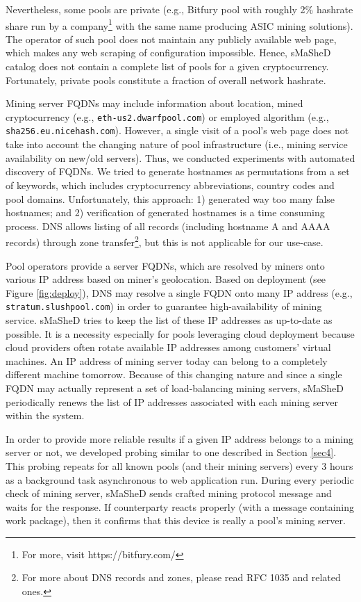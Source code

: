 \documentclass[preprint,12pt,3p]{elsarticle}
\begin{document}
Nevertheless, some pools are private (e.g., Bitfury pool with roughly 2\% hashrate share \cite{BTCCOM-BITFURY} run by a company\footnote{For more, visit https://bitfury.com/} with the same name producing ASIC mining solutions). The operator of such pool does not maintain any publicly available web page, which makes any web scraping of configuration impossible. Hence, sMaSheD catalog does not contain a complete list of pools for a given cryptocurrency. Fortunately, private pools constitute a fraction of overall network hashrate.

Mining server FQDNs may include information about location, mined cryptocurrency (e.g., \texttt{eth-us2.dwarfpool.com}) or employed algorithm (e.g., \texttt{sha256.eu.nicehash.com}). However, a single visit of a pool's web page does not take into account the changing nature of pool infrastructure (i.e., mining service availability on new/old servers). Thus, we conducted experiments with automated discovery of FQDNs. We tried to generate hostnames as permutations from a set of keywords, which includes cryptocurrency abbreviations, country codes and pool domains. Unfortunately, this approach: 1) generated way too many false hostnames; and 2) verification of generated hostnames is a time consuming process. DNS allows listing of all records (including hostname A and AAAA records) through zone transfer\footnote{For more about DNS records and zones, please read RFC 1035 and related ones.}, but this is not applicable for our use-case.

Pool operators provide a server FQDNs, which are resolved by miners onto various IP address based on miner's geolocation. Based on deployment (see Figure \ref{fig:deploy}), DNS may resolve a single FQDN onto many IP address (e.g., \texttt{stratum.slushpool.com}) in order to guarantee high-availability of mining service. sMaSheD tries to keep the list of these IP addresses as up-to-date as possible. It is a necessity especially for pools leveraging cloud deployment because cloud providers often rotate available IP addresses among customers' virtual machines. An IP address of mining server today can belong to a completely different machine tomorrow. Because of this changing nature and since a single FQDN may actually represent a set of load-balancing mining servers, sMaSheD periodically renews the list of IP addresses associated with each mining server within the system.

In order to provide more reliable results if a given IP address belongs to a mining server or not, we developed probing similar to one described in Section \ref{sec4}. This probing repeats for all known pools (and their mining servers) every 3 hours as a background task asynchronous to web application run. During every periodic check of mining server, sMaSheD sends crafted mining protocol message and waits for the response. If counterparty reacts properly (with a message containing work package), then it confirms that this device is really a pool's mining server.
\end{document}
